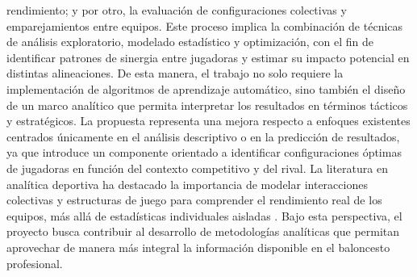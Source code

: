 rendimiento; y por otro, la evaluación de configuraciones colectivas y emparejamientos entre equipos. Este proceso implica la combinación de técnicas de análisis exploratorio, modelado estadístico y optimización, con
el fin de identificar patrones de sinergia entre jugadoras y estimar su impacto potencial en distintas alineaciones.
De esta manera, el trabajo no solo requiere la implementación de algoritmos de aprendizaje automático, sino
también el diseño de un marco analítico que permita interpretar los resultados en términos tácticos y
estratégicos.
La propuesta representa una mejora respecto a enfoques existentes centrados únicamente en el análisis
descriptivo o en la predicción de resultados, ya que introduce un componente orientado a identificar
configuraciones óptimas de jugadoras en función del contexto competitivo y del rival. La literatura en analítica
deportiva ha destacado la importancia de modelar interacciones colectivas y estructuras de juego para
comprender el rendimiento real de los equipos, más allá de estadísticas individuales aisladas \cite{skinner2010price}. Bajo esta
perspectiva, el proyecto busca contribuir al desarrollo de metodologías analíticas que permitan aprovechar de
manera más integral la información disponible en el baloncesto profesional.
\cite{devlin2020identifyinggroupcontributionsnba}